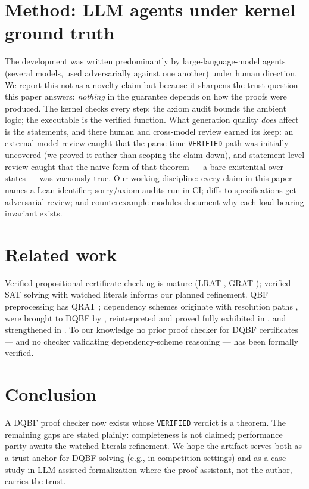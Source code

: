 \documentclass{article}
\begin{document}
\section{Method: LLM agents under kernel ground truth}\label{sec:method}
The development was written predominantly by large-language-model agents
(several models, used adversarially against one another) under human
direction. We report this not as a novelty claim but because it sharpens the
trust question this paper answers: \emph{nothing} in the guarantee depends
on how the proofs were produced. The kernel checks every step; the axiom
audit bounds the ambient logic; the executable is the verified function.
What generation quality \emph{does} affect is the statements, and there
human and cross-model review earned its keep: an external model review
caught that the parse-time \texttt{VERIFIED} path was initially uncovered
(we proved it rather than scoping the claim down), and statement-level
review caught that the naive form of that theorem --- a bare existential
over states --- was vacuously true. Our working discipline: every claim in
this paper names a Lean identifier; sorry/axiom audits run in CI; diffs to
specifications get adversarial review; and counterexample modules document
why each load-bearing invariant exists.

\section{Related work}
Verified propositional certificate checking is mature
(LRAT \cite{CruzFilipeEtAl2017}, GRAT \cite{Lammich2017}); verified SAT
solving with watched literals \cite{BlanchetteFleuryWeidenbach2018} informs
our planned refinement. QBF preprocessing has QRAT
\cite{HeuleSeidlBiere2014}; dependency schemes originate with resolution
paths \cite{VanGelder2011,SlivovskySzeider2012}, were brought to DQBF by
\cite{WimmerWimmerSchollBecker2016}, reinterpreted and proved fully
exhibited in \cite{BeyersdorffBlinkhornChewSchmidtSuda2019}, and
strengthened in \cite{BeyersdorffBlinkhornPeitl2020}. To our knowledge no
prior proof checker for DQBF certificates — and no checker validating
dependency-scheme reasoning — has been formally verified.

\section{Conclusion}
A DQBF proof checker now exists whose \texttt{VERIFIED} verdict is a
theorem. The remaining gaps are stated plainly: completeness is not claimed;
performance parity awaits the watched-literals refinement. We hope the
artifact serves both as a trust anchor for DQBF solving (e.g., in
competition settings) and as a case study in LLM-assisted formalization
where the proof assistant, not the author, carries the trust.
\end{document}
